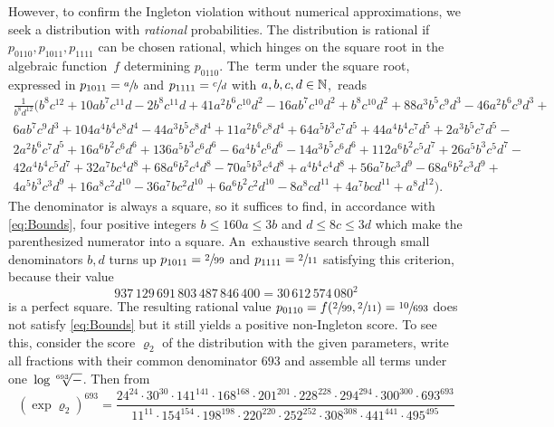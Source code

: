 \documentclass[11pt, a4paper]{tboege-preprint}
\renewcommand{\rho}{\varrho}
\begin{document}
However, to confirm the Ingleton violation without numerical approximations,
we seek a distribution with \emph{rational} probabilities. The distribution
is rational if $p_{0110}, p_{1011}, p_{1111}$ can be chosen rational, which
hinges on the square root in the algebraic function~$f$ determining $p_{0110}$.
The~term under the square root, expressed in $p_{1011} = \sfrac{a}{b}$ and
$p_{1111} = \sfrac{c}{d}$ with $a,b,c,d \in \mathbb{N}$,~reads
\begin{gather*}
  \frac1{b^{8} d^{12}} \Big(
  b^{8} c^{12} + 10 a b^{7} c^{11} d - 2 b^{8} c^{11} d + 41 a^{2} b^{6} c^{10} d^{2} - 16 a b^{7} c^{10} d^{2} + b^{8} c^{10} d^{2} + 88 a^{3} b^{5} c^{9} d^{3} - 46 a^{2} b^{6} c^{9} d^{3} + {} \\
  6 a b^{7} c^{9} d^{3} +  104 a^{4} b^{4} c^{8} d^{4} - 44 a^{3} b^{5} c^{8} d^{4} + 11 a^{2} b^{6} c^{8} d^{4} + 64 a^{5} b^{3} c^{7} d^{5} + 44 a^{4} b^{4} c^{7} d^{5} + 2 a^{3} b^{5} c^{7} d^{5} - {} \\
  2 a^{2} b^{6} c^{7} d^{5} + 16 a^{6} b^{2} c^{6} d^{6} + 136 a^{5} b^{3} c^{6} d^{6} - 6 a^{4} b^{4} c^{6} d^{6} - 14 a^{3} b^{5} c^{6} d^{6} + 112 a^{6} b^{2} c^{5} d^{7} + 26 a^{5} b^{3} c^{5} d^{7} - {} \\
  42 a^{4} b^{4} c^{5} d^{7} + 32 a^{7} b c^{4} d^{8} + 68 a^{6} b^{2} c^{4} d^{8} - 70 a^{5} b^{3} c^{4} d^{8} + a^{4} b^{4} c^{4} d^{8} + 56 a^{7} b c^{3} d^{9} - 68 a^{6} b^{2} c^{3} d^{9} + {} \\
  4 a^{5} b^{3} c^{3} d^{9} + 16 a^{8} c^{2} d^{10} - 36 a^{7} b c^{2} d^{10} + 6 a^{6} b^{2} c^{2} d^{10} - 8 a^{8} c d^{11} + 4 a^{7} b c d^{11} + a^{8} d^{12} \Big).
\end{gather*}
The denominator is always a square, so it suffices to find, in accordance
with \eqref{eq:Bounds}, four positive integers $b \le 160a \le 3b$ and
$d \le 8c \le 3d$ which make the parenthesized numerator into a square.
An~exhaustive search through small denominators $b, d$ turns up $p_{1011}
= \sfrac{2}{99}$ and $p_{1111} = \sfrac{2}{11}$ satisfying this criterion,
because their value
\[
  937\,129\,691\,803\,487\,846\,400 = 30\,612\,574\,080^2
\]
is a perfect square. The resulting rational value $p_{0110} = f(\sfrac{2}{99},
\sfrac{2}{11}) = \sfrac{10}{693}$ does not satisfy \eqref{eq:Bounds} but it still
yields a positive non-Ingleton score. To see this, consider the score $\rho_2$ of
the distribution with the given parameters, write all fractions with their
common denominator $693$ and assemble all terms under one~$\log \sqrt[693]{{-}}$.
Then from
\[
  \left(\exp \rho_2\right)^{693} = \frac{
    24^{24} \cdot 30^{30} \cdot 141^{141} \cdot 168^{168} \cdot 201^{201} \cdot 228^{228} \cdot 294^{294} \cdot 300^{300} \cdot 693^{693}
  }{
    11^{11} \cdot 154^{154} \cdot 198^{198} \cdot 220^{220} \cdot 252^{252} \cdot 308^{308} \cdot 441^{441} \cdot 495^{495}
  }
\]
\end{document}

